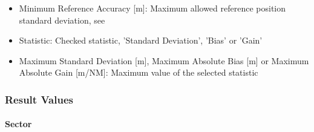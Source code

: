 \begin{itemize}
\item Minimum Reference Accuracy [m]: Maximum allowed reference position standard deviation, see 
\item Statistic: Checked statistic, 'Standard Deviation', 'Bias' or 'Gain'
\item Maximum Standard Deviation [m], Maximum Absolute Bias [m] or Maximum Absolute Gain [m/NM]: Maximum
value of the selected statistic
\end{itemize}

\subsubsection{Result Values}

\paragraph{Sector}

